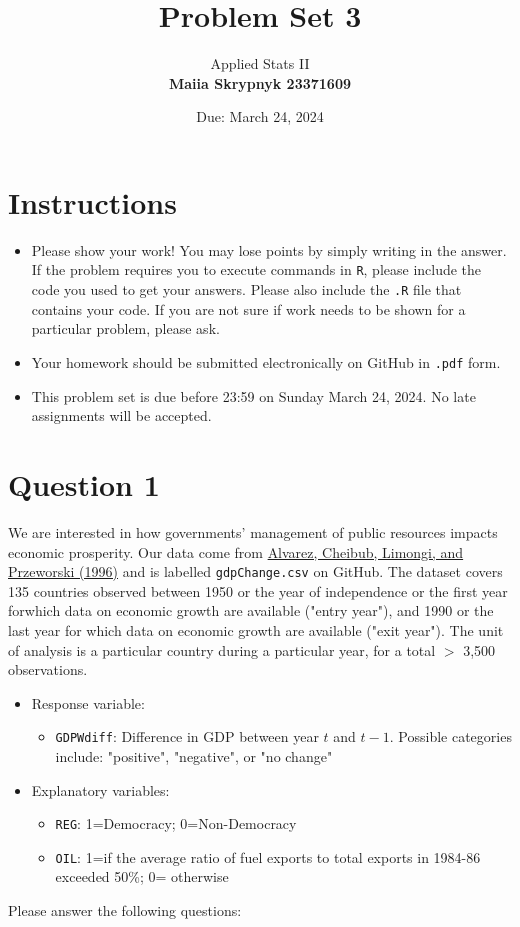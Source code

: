 \documentclass[12pt,letterpaper]{article}
\title{Problem Set 3}
\date{Due: March 24, 2024}
\author{Applied Stats II \\ \vspace{\baselineskip}
	\textbf{Maiia Skrypnyk 23371609}}
\begin{document}
	\maketitle
	\section*{Instructions}
	\begin{itemize}
	\item Please show your work! You may lose points by simply writing in the answer. If the problem requires you to execute commands in \texttt{R}, please include the code you used to get your answers. Please also include the \texttt{.R} file that contains your code. If you are not sure if work needs to be shown for a particular problem, please ask.
\item Your homework should be submitted electronically on GitHub in \texttt{.pdf} form.
\item This problem set is due before 23:59 on Sunday March 24, 2024. No late assignments will be accepted.
	\end{itemize}

	\vspace{.25cm}
\section*{Question 1}
\vspace{.25cm}
\noindent We are interested in how governments' management of public resources impacts economic prosperity. Our data come from \href{https://www.researchgate.net/profile/Adam_Przeworski/publication/240357392_Classifying_Political_Regimes/links/0deec532194849aefa000000/Classifying-Political-Regimes.pdf}{Alvarez, Cheibub, Limongi, and Przeworski (1996)} and is labelled \texttt{gdpChange.csv} on GitHub. The dataset covers 135 countries observed between 1950 or the year of independence or the first year forwhich data on economic growth are available ("entry year"), and 1990 or the last year for which data on economic growth are available ("exit year"). The unit of analysis is a particular country during a particular year, for a total $>$ 3,500 observations. 

\begin{itemize}
	\item
	Response variable: 
	\begin{itemize}
		\item \texttt{GDPWdiff}: Difference in GDP between year $t$ and $t-1$. Possible categories include: "positive", "negative", or "no change"
	\end{itemize}
	\item
	Explanatory variables: 
	\begin{itemize}
		\item
		\texttt{REG}: 1=Democracy; 0=Non-Democracy
		\item
		\texttt{OIL}: 1=if the average ratio of fuel exports to total exports in 1984-86 exceeded 50\%; 0= otherwise
	\end{itemize}
	
\end{itemize}
\newpage
\noindent Please answer the following questions:
\end{document}
